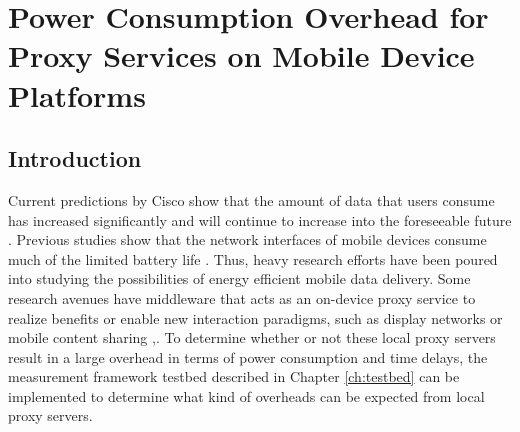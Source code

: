 \chapter{Power Consumption Overhead for Proxy Services on Mobile Device Platforms}
\section*{Introduction}
Current predictions by Cisco show that the amount of data that users consume has increased significantly and will continue to increase into the foreseeable future \cite{VNI14}. Previous studies show that the network interfaces of mobile devices consume much of the limited battery life \cite{Carroll:2010:APC:1855840.1855861}. Thus, heavy research efforts have been poured into studying the possibilities of energy efficient mobile data delivery. Some research avenues have middleware that acts as an on-device proxy service to realize benefits or enable new interaction paradigms, such as display networks \cite{6174992} or mobile content sharing \cite{Seeling:2014:OES:2671189.2671194},\cite{6692468}. To determine whether or not these local proxy servers result in a large overhead in terms of power consumption and time delays, the measurement framework testbed described in Chapter \ref{ch:testbed} can be implemented to determine what kind of overheads can be expected from local proxy servers. 

